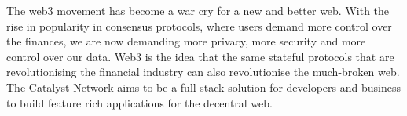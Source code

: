 The web3 movement has become a war cry for a new and better web. With the rise in popularity in consensus protocols, where users demand more control over the finances, we are now demanding more privacy, more security and more control over our data. Web3 is the idea that the same stateful protocols that are revolutionising the financial industry can also revolutionise the much-broken web. The Catalyst Network aims to be a full stack solution for developers and business to build feature rich applications for the decentral web.